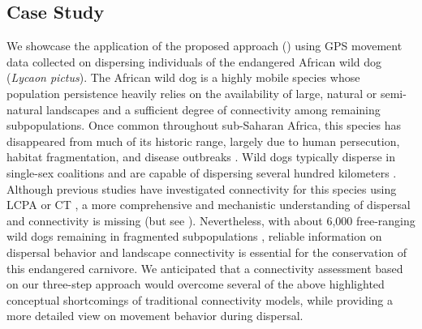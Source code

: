 \documentclass[abstract=on,10pt,a4paper,bibliography=totocnumbered]{article}
\begin{document}
\subsection{Case Study}
We showcase the application of the proposed approach ()
using GPS movement data collected on dispersing individuals of the endangered
African wild dog (\textit{Lycaon pictus}). The African wild dog is a highly
mobile species whose population persistence heavily relies on the availability
of large, natural or semi-natural landscapes and a sufficient degree of
connectivity among remaining subpopulations. Once common throughout sub-Saharan
Africa, this species has disappeared from much of its historic range, largely
due to human persecution, habitat fragmentation, and disease outbreaks
\citep{Woodroffe.2012}. Wild dogs typically disperse in single-sex coalitions
\citep{McNutt.1996, Behr.2020} and are capable of dispersing several hundred
kilometers \citep{DaviesMostert.2012, Masenga.2016, Cozzi.2020}. Although
previous studies have investigated connectivity for this species using LCPA
\citep{Hofmann.2021} or CT \citep{Brennan.2020}, a more comprehensive and
mechanistic understanding of dispersal and connectivity is missing (but see
\citealp{Creel.2020}). Nevertheless, with about 6,000 free-ranging wild dogs
remaining in fragmented subpopulations \citep{Woodroffe.2012}, reliable
information on dispersal behavior and landscape connectivity is essential for
the conservation of this endangered carnivore. We anticipated that a
connectivity assessment based on our three-step approach would overcome several
of the above highlighted conceptual shortcomings of traditional connectivity
models, while providing a more detailed view on movement behavior during
dispersal.
\end{document}
